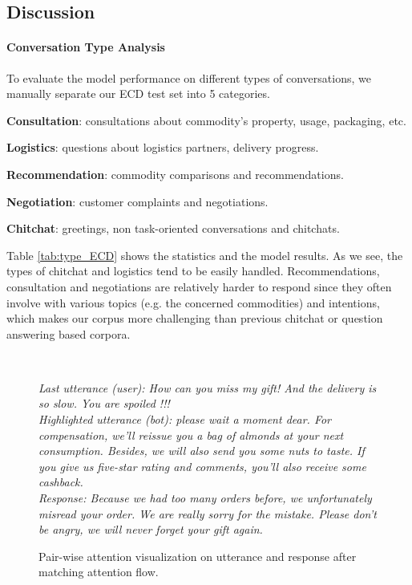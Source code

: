 \documentclass[11pt]{article}
\begin{document}
\subsection{Discussion}

\paragraph{Conversation Type Analysis}
To evaluate the model performance on different types of conversations, we manually separate our ECD test set into 5 categories.

\textbf{ Consultation}: consultations about commodity's property, usage, packaging, etc. 

\textbf{ Logistics}: questions about logistics partners, delivery progress. 

\textbf{ Recommendation}: commodity comparisons and recommendations.

\textbf{ Negotiation}: customer complaints and negotiations.

\textbf{ Chitchat}: greetings, non task-oriented conversations and chitchats.

Table \ref{tab:type_ECD} shows the statistics and the model results. As we see, the types of chitchat and logistics tend to be easily handled. Recommendations, consultation and negotiations are relatively harder to respond since they often involve with various topics (e.g. the concerned commodities) and intentions, which makes our corpus more challenging than previous chitchat or question answering based corpora. 

\begin{figure*}\centering
	
	\\\begin{flushleft}
	\scriptsize{\emph{
			Last utterance (user): How can you miss my gift! And the delivery is so slow. You are spoiled !!!
			\\Highlighted utterance (bot): please wait a moment dear. For compensation, we'll reissue you a bag of almonds at your next consumption. Besides, we will also send you some nuts to taste. If you give us five-star rating and comments, you'll also receive some cashback.     
			\\Response: Because we had too many orders before, we unfortunately misread your order. We are really sorry for the mistake. Please don't be angry, we will never forget your gift again.} }\end{flushleft}
	
	\caption{Pair-wise attention visualization on utterance and response after matching attention flow.} \label{fig:attention}	
\end{figure*} 
\end{document}
